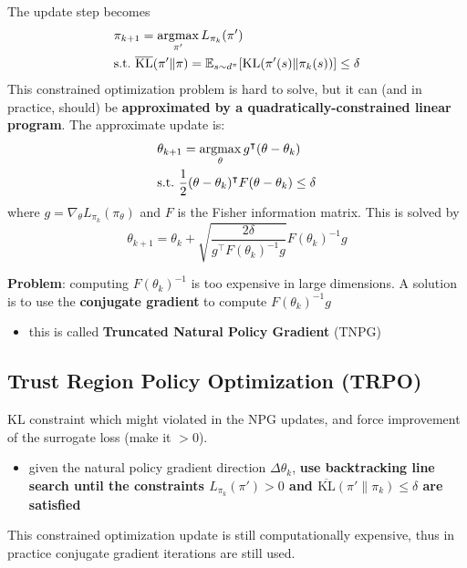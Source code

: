 \documentclass[../course-notes.tex]{subfiles}
\begin{document}
The update step becomes
\begin{equation}
\begin{aligned}
	&\pi_{k+1} = \operatorname*{\mathrm{argmax}}_{\pi'} L_{\pi_k}(\pi')  \\
	& \mathrm{s.t.} \ \overline{\mathrm{KL}}(\pi'\|\pi) = \operatorname{\mathbb{E}}_{s\sim d^\pi}[\mathrm{KL}(\pi'(s)\|\pi_k(s))] \leq \delta
\end{aligned}
\end{equation}
This constrained optimization problem is hard to solve, but it can (and in practice, should) be \textbf{approximated by a quadratically-constrained linear program}. The approximate update is:
\[
\begin{aligned}
	&\theta_{k+1} = \operatorname*{\mathrm{argmax}}_\theta g^\intercal (\theta - \theta_k)  \\
	& \mathrm{s.t.}\  \frac{1}{2}(\theta-\theta_k)^\intercal F (\theta - \theta_k) \leq \delta
\end{aligned}
\]
where $g = \nabla_\theta L_{\pi_k}(\pi_\theta)$ and $F$ is the Fisher information matrix. This is solved by
\begin{equation}\label{eq:NPGupdate}
	\theta_{k+1} = \theta_k + \sqrt{\frac{2\delta}{g^\intercal F(\theta_k)^{-1}g}} F(\theta_k)^{-1}g
\end{equation}


\textbf{\redfont Problem}: computing $F(\theta_k)^{-1}$ is too expensive in large dimensions. A solution is to use the \textbf{conjugate gradient} to compute $F(\theta_k)^{-1}g$
\begin{itemize}
	\item[\textrightarrow] this is called \textbf{\bluefont Truncated Natural Policy Gradient} (TNPG)
\end{itemize}


\subsection{Trust Region Policy Optimization (TRPO) \cite{schulman2015trust}}

\textcite{schulman2015trust} KL constraint which might violated in the NPG updates, and force improvement of the surrogate loss (make it $>0$).
\begin{itemize}
	\item[\textrightarrow] given the natural policy gradient direction $\Delta\theta_k$, \textbf{\boldmath use backtracking line search until the constraints $L_{\pi_k}(\pi') > 0$ and $\overline{\mathrm{KL}}(\pi'\|\pi_k) \leq \delta$ are satisfied}
\end{itemize}
This constrained optimization update is still computationally expensive, thus in practice conjugate gradient iterations are still used.
\end{document}
